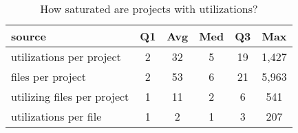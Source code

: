 \begin{table}[tb]
\begin{center}
\begin{small}
\caption{How saturated are projects with utilizations?}
\label{table:saturation}

\begin{tabular}{l|ccccc}
\toprule
source & Q1 & Avg & Med & Q3 & Max \\
 \midrule \bigstrut
utilizations per project & 2 & 32 & 5 & 19 & 1,427 \\
 \midrule \bigstrut
files per project & 2 & 53 & 6 & 21 & 5,963 \\
 \midrule \bigstrut
utilizing files per project & 1 & 11 & 2 & 6 & 541 \\
 \midrule \bigstrut
utilizations per file & 1 & 2 & 1 & 3 & 207 \\
\bottomrule
\end{tabular}
\end{small}
\end{center}
\vspace{-12pt}
\end{table}
